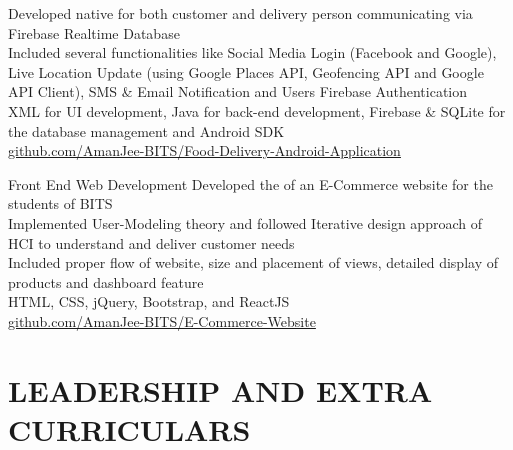 \documentclass[]{barua-resume-openfont}
\begin{document}
\begin{minipage}[t]{0.67\textwidth}
\textbullet{} Developed native 
{} for both customer and delivery person communicating via Firebase Realtime Database\\
\textbullet{} Included several functionalities like Social Media Login (Facebook and Google), Live Location Update (using Google Places API, Geofencing API and Google API Client), SMS \& Email Notification and Users Firebase Authentication\\
\textbullet{} 
{} XML for UI development, Java for back-end development, Firebase \& SQLite for the database management and Android SDK\\ 
\textbullet{} {\href{https://github.com/AmanJee-BITS/Food-Delivery-Android-Application}{\faGithub \hspace{1pt} github.com/AmanJee-BITS/Food-Delivery-Android-Application}}\\
\sectionsep
\bigskip

{Front End Web Development}
\descript{}
\textbullet{} Developed the 
{} of an E-Commerce website for the students of BITS\\
\textbullet{} Implemented User-Modeling theory and followed Iterative design approach of HCI to understand and deliver customer needs\\
\textbullet{} Included proper flow of website, size and placement of views, detailed display of products and dashboard feature\\ 
\textbullet{} {} HTML, CSS, jQuery, Bootstrap, and ReactJS\\
\textbullet{} {\href{https://github.com/AmanJee-BITS/E-Commerce-Website}
{\faGithub \hspace{1pt} github.com/AmanJee-BITS/E-Commerce-Website}}\\
\sectionsep



\section{LEADERSHIP AND EXTRA CURRICULARS}


\end{minipage}
\end{document}
